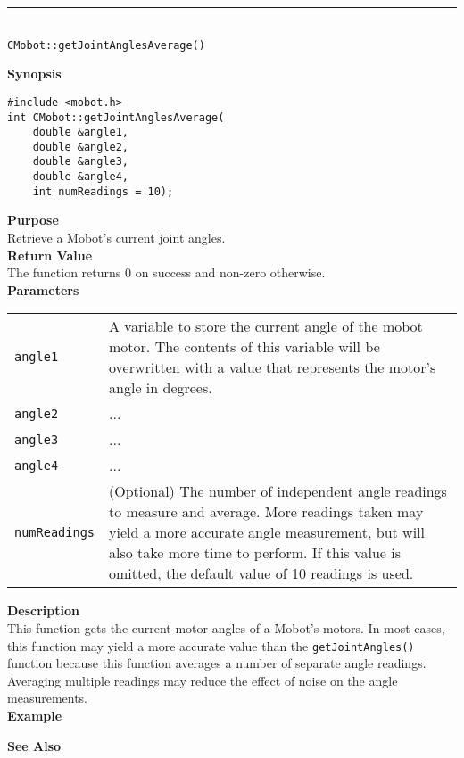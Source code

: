 \noindent
\vspace{5pt}
\rule{4.5in}{0.015in}\\
\noindent
{\LARGE \texttt{CMobot::getJointAnglesAverage()}}\\
{}

\noindent
{\bf Synopsis}
\vspace{-8pt}
\begin{verbatim}
#include <mobot.h>
int CMobot::getJointAnglesAverage(
    double &angle1,
    double &angle2,
    double &angle3,
    double &angle4,
    int numReadings = 10);
\end{verbatim}

\noindent
{\bf Purpose}\\
Retrieve a Mobot's current joint angles.\\

\noindent
{\bf Return Value}\\
The function returns 0 on success and non-zero otherwise.\\

\noindent
{\bf Parameters}\\
\vspace{-0.1in}
\begin{description}
\item               
\begin{tabular}{p{15 mm}p{145 mm}}
\texttt{angle1} & A variable to store the current angle of the mobot
motor. The contents of this variable will be overwritten with a value that
represents the motor's angle in degrees.  \\
\texttt{angle2} & ...  \\
\texttt{angle3} & ...  \\
\texttt{angle4} & ...  \\
\texttt{numReadings} & (Optional) The number of independent angle readings to measure 
and average. More readings taken may yield a more accurate angle measurement, but will also
take more time to perform. If this value is omitted, the default value of 10 readings is
used.
\end{tabular}
\end{description}

\noindent
{\bf Description}\\
This function gets the current motor angles of a Mobot's motors. In most cases, this
function may yield a more accurate value than the \texttt{getJointAngles()} function
because this function averages a number of separate angle readings. Averaging multiple 
readings may reduce the effect of noise on the angle measurements.
\\
\noindent
{\bf Example}\\
\noindent

\noindent
{\bf See Also}\\

